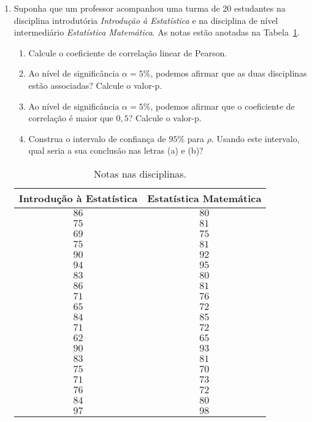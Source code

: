 \documentclass[8pt, a4paper]{article}
\begin{document}
\begin{enumerate}
	\item Suponha que um professor acompanhou uma turma de 20 estudantes na disciplina introdutória \textit{Introdução à Estatística} e na disciplina de nível intermediário \textit{Estatística Matemática}. As notas estão anotadas na Tabela~\ref{tab:E11-7}. 
	\begin{enumerate}
		\item Calcule o coeficiente de correlação linear de Pearson.
		\item Ao nível de significância $\alpha=5\%$, podemos afirmar que as duas disciplinas estão associadas? Calcule o valor-p.
		\item Ao nível de significância $\alpha=5\%$, podemos afirmar que o coeficiente de correlação é maior que $0,5$? Calcule o valor-p.
		\item Construa o intervalo de confiança de $95\%$ para $\rho$. Usando este intervalo, qual seria a sua conclusão nas letras (a) e (b)?
	\end{enumerate}
	\begin{table}[htbp]
		\centering
		\caption{Notas nas disciplinas.}
		\label{tab:E11-7}
		\begin{tabular}{cc}
			\toprule
			\textbf{Introdução à Estatística} & \textbf{Estatística Matemática} \\ 
			\midrule
			$86$ & $80$ \\ 
			$75$ & $81$ \\ 
			$69$ & $75$ \\ 
			$75$ & $81$ \\ 
			$90$ & $92$ \\ 
			$94$ & $95$ \\ 
			$83$ & $80$ \\ 
			$86$ & $81$ \\ 
			$71$ & $76$ \\ 
			$65$ & $72$ \\ 
			$84$ & $85$ \\ 
			$71$ & $72$ \\ 
			$62$ & $65$ \\ 
			$90$ & $93$ \\ 
			$83$ & $81$ \\ 
			$75$ & $70$ \\ 
			$71$ & $73$ \\ 
			$76$ & $72$ \\ 
			$84$ & $80$ \\ 
			$97$ & $98$ \\ 
			\bottomrule
		\end{tabular}		
	\end{table}


\end{enumerate}
\end{document}
